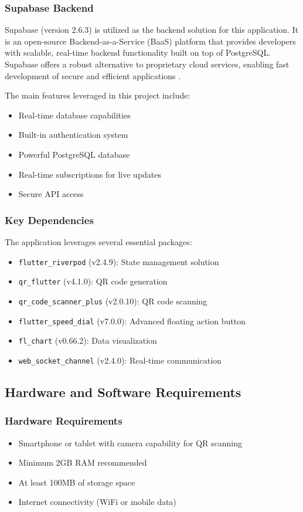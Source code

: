 \subsubsection{Supabase Backend}

Supabase (version 2.6.3) is utilized as the backend solution for this application. It is an open-source Backend-as-a-Service (BaaS) platform that provides developers with scalable, real-time backend functionality built on top of PostgreSQL. Supabase offers a robust alternative to proprietary cloud services, enabling fast development of secure and efficient applications \cite{supabaseDocs}.

The main features leveraged in this project include:
\begin{itemize}
    \item Real-time database capabilities
    \item Built-in authentication system
    \item Powerful PostgreSQL database
    \item Real-time subscriptions for live updates
    \item Secure API access
\end{itemize}


\subsubsection{Key Dependencies}
The application leverages several essential packages:
\begin{itemize}
    \item \texttt{flutter\_riverpod} (v2.4.9): State management solution
    \item \texttt{qr\_flutter} (v4.1.0): QR code generation
    \item \texttt{qr\_code\_scanner\_plus} (v2.0.10): QR code scanning
    \item \texttt{flutter\_speed\_dial} (v7.0.0): Advanced floating action button
    \item \texttt{fl\_chart} (v0.66.2): Data visualization
    \item \texttt{web\_socket\_channel} (v2.4.0): Real-time communication
\end{itemize}

\subsection{Hardware and Software Requirements}

\subsubsection{Hardware Requirements}
\begin{itemize}
    \item Smartphone or tablet with camera capability for QR scanning
    \item Minimum 2GB RAM recommended
    \item At least 100MB of storage space
    \item Internet connectivity (WiFi or mobile data)
\end{itemize}

